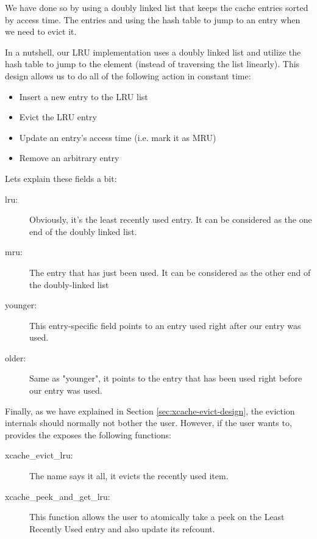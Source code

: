 
We have done so by using a doubly linked list that keeps the cache entries 
sorted by access time.  The entries and using the hash table to jump to an 
entry when we need to evict it.



In a nutshell, our LRU implementation uses a doubly linked list and utilize the 
hash table to jump to the element (instead of traversing the list linearly).
This design allows us to do all of the following action in constant time:

\begin{itemize}
	\item Insert a new entry to the LRU list
	\item Evict the LRU entry
	\item Update an entry's access time (i.e. mark it as MRU)
	\item Remove an arbitrary entry
\end{itemize}

Lets explain these fields a bit:

\begin{description}
	\item[lru:] Obviously, it's the least recently used entry. It can be 
		considered as the one end of the doubly linked list.
	\item[mru:] The entry that has just been used. It can be considered as 
		the other end of the doubly-linked list
	\item[younger:] This entry-specific field points to an entry used right 
		after our entry was used.
	\item[older:] Same as "younger", it points to the entry that has been 
		used right before our entry was used.
\end{description}

Finally, as we have explained in Section \ref{sec:xcache-evict-design}, the 
eviction internals should normally not bother the user. However, if the user 
wants to, \xcache provides the exposes the following functions:

\begin{description}
	\item[xcache\_evict\_lru:] The name says it all, it evicts the recently 
		used item.
	\item[xcache\_peek\_and\_get\_lru:] This function allows the user to 
		atomically take a peek on the Least Recently Used entry and also 
		update its refcount.
\end{description}

